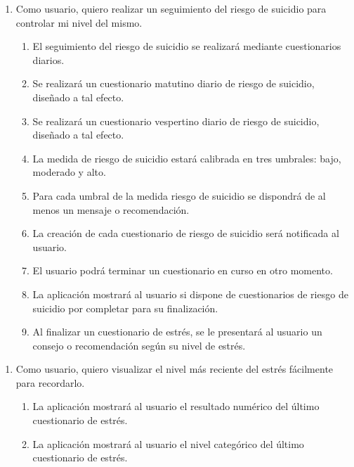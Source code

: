         \begin{enumerate}[resume=req-usuario,label=\textbf{\texttt{RU-\arabic*}}]
            \item Como usuario, quiero realizar un seguimiento del riesgo de suicidio para controlar mi nivel del mismo.
            \begin{enumerate}[resume=req-funcionales,label=\textbf{\texttt{RF-\arabic*}}]
                \item El seguimiento del riesgo de suicidio se realizará mediante cuestionarios diarios.
                \item Se realizará un cuestionario matutino diario de riesgo de suicidio, diseñado a tal efecto.
                \item Se realizará un cuestionario vespertino diario de riesgo de suicidio, diseñado a tal efecto.
                \item La medida de riesgo de suicidio estará calibrada en tres umbrales: bajo, moderado y alto.
                \item Para cada umbral de la medida riesgo de suicidio se dispondrá de al menos un mensaje o recomendación.
                \item La creación de cada cuestionario de riesgo de suicidio será notificada al usuario.
                \item El usuario podrá terminar un cuestionario en curso en otro momento.
                \item La aplicación mostrará al usuario si dispone de cuestionarios de riesgo de suicidio por completar para su finalización.
                \item Al finalizar un cuestionario de estrés, se le presentará al usuario un consejo o recomendación según su nivel de estrés.
            \end{enumerate}
        \end{enumerate}
        \begin{enumerate}[resume=req-usuario,label=\textbf{\texttt{RU-\arabic*}}]
            \item Como usuario, quiero visualizar el nivel más reciente del estrés fácilmente para recordarlo.
            \begin{enumerate}[resume=req-funcionales,label=\textbf{\texttt{RF-\arabic*}}]
                \item La aplicación mostrará al usuario el resultado numérico del último cuestionario de estrés.
                \item La aplicación mostrará al usuario el nivel categórico del último cuestionario de estrés.
            \end{enumerate}
        \end{enumerate}
